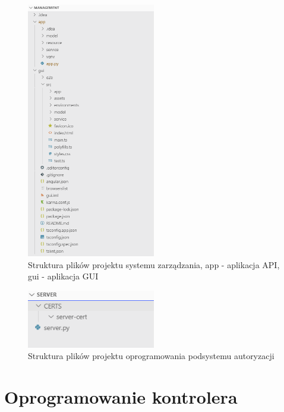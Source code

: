     \begin{figure}[]
        \centering
        \includegraphics[width=0.5\textwidth]{chapters/images/struktura_katalogow_mngmt.png}
        \caption[{Struktura plików projektu systemu zarządzania}]{Struktura plików projektu systemu zarządzania, app - aplikacja API, gui - aplikacja GUI}
        \label{fig:zarzadzanie_katalogi}
    \end{figure}

    \begin{figure}[]
        \centering
        \includegraphics[width=0.5\textwidth]{chapters/images/struktura_katalogow_serwer.png}
        \caption{Struktura plików projektu oprogramowania podsystemu autoryzacji}
        \label{fig:serwer_katalogi}
    \end{figure}

\section{Oprogramowanie kontrolera}

